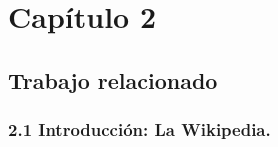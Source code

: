 \documentclass[letterpaper]{article}
\begin{document}
\section{}
\section{}
\section{}
\section{}
\section{}
\section{}
\section{}
\section{}
\section{}
\section{}
\section{}
\section{}
\section{}
\clearpage\section[Cap\'itulo 2]{Cap\'itulo 2}
\hypertarget{RefHeading4000985831413}{}\subsection[Trabajo
relacionado]{Trabajo relacionado}
\hypertarget{RefHeading4002985831413}{}\subsubsection[2.1
Introducci\'on: La Wikipedia.]{2.1 Introducci\'on: La Wikipedia.}
\hypertarget{RefHeading4004985831413}{}
\bigskip
\end{document}
